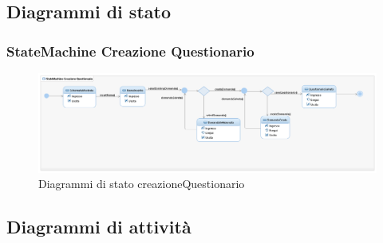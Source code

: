 \documentclass[12pt]{article}
\begin{document}
\subsection{Diagrammi di stato}
\subsubsection{StateMachine Creazione Questionario}
\begin{figure}[H]
\centering
\includegraphics[scale=0.40]{UNIMIBModule_StatemachineDiagramCreazioneQuestionario.png}
\caption{Diagrammi di stato creazioneQuestionario}
\end{figure}
\subsection{Diagrammi di attivit\`{a}}
\end{document}
